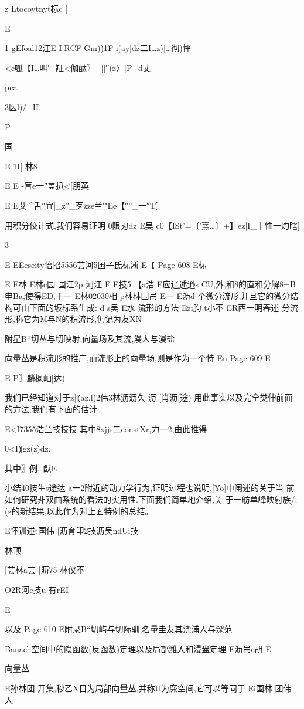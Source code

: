 {z
Ltocoytnyt标c
[

E

1
gEfoal12江E
I|RCF-Gm))1F-i(ay|dz二I…z)|…彻)怦

<c呱【I…叫′_缸<伽酞〗_[|′′(z〉|P_d丈

pca

3医l)/_IL

P

国

E
1I[
林8

E
E
-盲e一″盖扒<[朋英

E
E艾`^舌″宜]_z′′_歹zze兰′"Ee【″”_一″T〕

用积分佼计式,我们容易证明
0限刃dz
E吴
c0【ISt'=〔′熹…〕+】ez[I_丨恤一灼瞎]

3

E
EEeseity怡招5556芸河5国子氏标淅
E【
Page-608
E标

E
E林
E林c园
国江2p
河江
E
E技5
【a浩
E应辽述逊s
CU,外,和8的直和分解8=B申Ba,使得ED,干一
E林02030相
p林林国吊
E一
E沥d
个微分流形,并旦它的微分结构可由下面的坂标系生成:
d
s吴
E水
流形的方法
Ezi朐
t小不
ER西一明春述
分流形,称它为M与N的积流形,仍记为友XN-

附星B“切丛与切映射,向量场及其流,漫人与漫盐

向量丛是积流形的推广,而流形上的向量场,则是作为一个特
Eu
Page-609
E

E
P〗麟枫岫[达)

我们已经知道对于z[〖az,l)2伟3林沥沥久
沥
[肖沥[途)
用此事实以及完全类伸前面的方法,我们有下面的估计

E<I7355浩兰技技技
其中8xjjs二constXr,力一2,由此推得

0<I〗gz(z)dz,

其中〗例…猷E

小结40技生s途达
a一2附近的动力学行为,证明过程也说明,[Yo]中闸述的关于当
前如何研究非双曲系统的看法的实用性.下面我们简单地介绍,关
于一舫单峰映射族/:(z的新结果,以此作为对上面特例的总结。

E怀训述t国伟
[沥育印2技沥吴ndUi技

林顶

[芸林a芸
[沥75
林仪不

O2R河c技u
有rEI

E

以及
Page-610
E附录B“切屿与切际驯,名量圭友其浇浦人与深范

Banach空间中的隐函数(反函数)定理以及局部潍入和浸盎定理
E沥吊c胡
E

向量丛

E孙林团
开集,秒乙X日为局部向量丛,并称U为廉空间,它可以等同于
Ei国林
团伟
人

}
